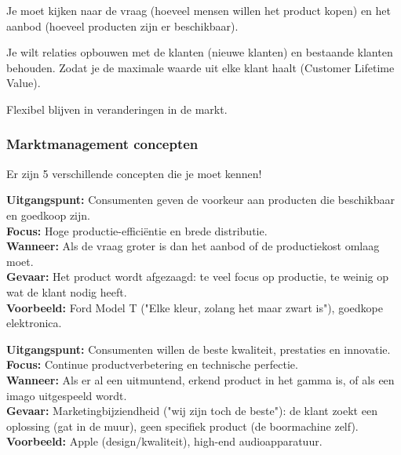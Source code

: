 \documentclass[a4paper,11pt]{article}
\begin{document}
Je moet kijken naar de vraag (hoeveel mensen willen het product kopen)
en het aanbod (hoeveel producten zijn er beschikbaar).
\newline

Je wilt relaties opbouwen met de klanten (nieuwe klanten) en bestaande klanten behouden.
Zodat je de maximale waarde uit elke klant haalt (Customer Lifetime Value).
\newline

Flexibel blijven in veranderingen in de markt.


\subsubsection{Marktmanagement concepten}

Er zijn 5 verschillende concepten die je moet kennen!



\begin{tcolorbox}[schoolstyle, title=1. Productieconcept, colframe=schoolBlue!80!black, colback=white]
    \textbf{Uitgangspunt:} Consumenten geven de voorkeur aan producten die beschikbaar en goedkoop zijn. \\
    \textbf{Focus:} Hoge productie-efficiëntie en brede distributie. \\
    \textbf{Wanneer:} Als de vraag groter is dan het aanbod of de productiekost omlaag moet. \\
    \textbf{Gevaar:} Het product wordt afgezaagd: te veel focus op productie, te weinig op wat de klant nodig heeft. \\
    \textbf{Voorbeeld:} Ford Model T ("Elke kleur, zolang het maar zwart is"), goedkope elektronica.
\end{tcolorbox}

\begin{tcolorbox}[schoolstyle, title=2. Productconcept, colframe=schoolBlue!80!black, colback=white]
    \textbf{Uitgangspunt:} Consumenten willen de beste kwaliteit, prestaties en innovatie. \\
    \textbf{Focus:} Continue productverbetering en technische perfectie. \\
    \textbf{Wanneer:} Als er al een uitmuntend, erkend product in het gamma is, of als een imago uitgespeeld wordt. \\
    \textbf{Gevaar:} Marketingbijziendheid ("wij zijn toch de beste"): de klant zoekt een oplossing (gat in de muur), geen specifiek product (de boormachine zelf). \\
    \textbf{Voorbeeld:} Apple (design/kwaliteit), high-end audioapparatuur.
\end{tcolorbox}
\end{document}
